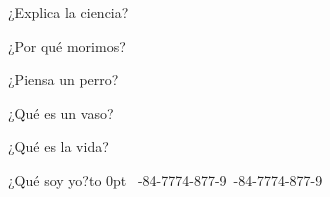  ¿Explica la ciencia?\par
 ¿Por qué morimos?\par
 ¿Piensa un perro?\par
 ¿Qué es un vaso?\par
 ¿Qué es la vida?\par
 ¿Qué soy yo?\kern4.4cm\vbox to 0pt{\vss\pdfBlack
  \hbox{%
   -84-7774-877-9
   \barheight=1in
   -84-7774-877-9
   \relax
 }\kern1pc}\par
\endinput

